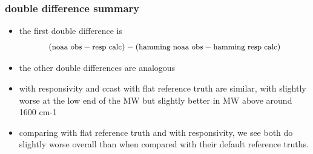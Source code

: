 \documentclass[11pt]{beamer}
\begin{document}
\begin{frame}
\frametitle{double difference summary}

\begin{itemize}

  \item the first double difference is 
    \[(\mbox{\small noaa obs} - \mbox{\small resp calc}) - 
       (\mbox{\small hamming noaa obs} - 
        \mbox{\small hamming resp calc})\]  

  \item the other double differences are analogous

  \item {\noaa} with responsivity and ccast with flat reference
    truth are similar, with {\ccast} slightly worse at the low end
    of the MW but slightly better in MW above around 1600 cm-1

  \item comparing {\noaa} with flat reference truth and {\ccast}
    with responsivity, we see both do slightly worse overall than
    when compared with their default reference truths.

\end{itemize}

\end{frame}
\end{document}

